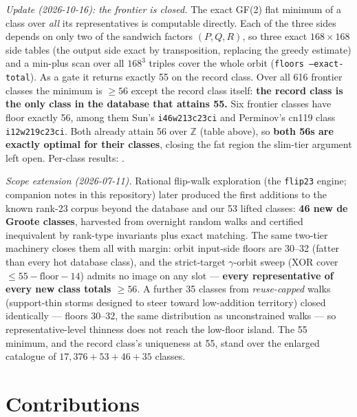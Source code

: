 \documentclass[10pt]{article}
\begin{document}
\begin{itemize}
  \emph{Update (2026-10-16): the frontier is closed.} The exact GF(2)
  flat minimum of a class over \emph{all} its representatives is
  computable directly.  Each of the three sides depends on only two
  of the sandwich factors $(P,Q,R)$, so three exact $168\times168$
  side tables (the output side exact by transposition, replacing the
  greedy estimate) and a min-plus scan over all $168^3$ triples cover
  the whole orbit (\texttt{floors --exact-total}).  As a gate it
  returns exactly 55 on the record class.  Over all 616 frontier
  classes the minimum is $\ge 56$ except the record class itself:
  \textbf{the record class is the only class in the database that
  attains 55.}  Six frontier classes have floor exactly 56, among
  them Sun's \texttt{i46w213c23ci} and Perminov's cn119 class
  \texttt{i12w219c23ci}.  Both already attain 56 over $\mathbb{Z}$
  (table above), so \textbf{both 56s are exactly optimal for their
  classes}, closing the fat region the slim-tier argument left open.
  Per-class results: .

  \emph{Scope extension (2026-07-11).} Rational flip-walk exploration
  (the \texttt{flip23} engine; companion notes in this repository)
  later produced the first additions to the known rank-23 corpus
  beyond the database and our 53 lifted classes: \textbf{46 new de
  Groote classes}, harvested from overnight random walks and
  certified inequivalent by rank-type invariants plus exact matching.
  The same two-tier machinery closes them all with margin: orbit
  input-side floors are 30--32 (fatter than every hot database
  class), and the strict-target $\gamma$-orbit sweep (XOR cover
  $\le 55 - \text{floor} - 14$) admits no image on any slot ---
  \textbf{every representative of every new class totals $\ge 56$}.
  A further 35 classes from \emph{reuse-capped} walks (support-thin
  storms designed to steer toward low-addition territory) closed
  identically --- floors 30--32, the same distribution as
  unconstrained walks --- so representative-level thinness does not
  reach the low-floor island. The 55 minimum, and the record class's
  uniqueness at 55, stand over the enlarged catalogue of
  $17{,}376 + 53 + 46 + 35$ classes.
\end{itemize}

\section{Contributions}\label{sec:contrib}
\end{document}
